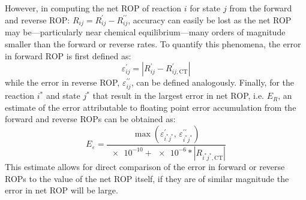 \documentclass[12pt,number,sort&compress]{elsarticle}
\begin{document}
However, in computing the net ROP of reaction $i$ for state $j$ from the forward and reverse ROP: $R_{ij} = R_{ij}^{\prime} - R_{ij}^{\prime\prime}$, accuracy can easily be lost as the net ROP may be---particularly near chemical equilibrium---many orders of magnitude smaller than the forward or reverse rates.
To quantify this phenomena, the error in forward ROP is first defined as:
\begin{equation}
\varepsilon^{\prime}_{ij} = \left\lvert R_{ij}^{\prime} - R_{ij,\text{CT}}^{\prime} \right\rvert
\end{equation}
while the error in reverse ROP, $\varepsilon^{\prime\prime}_{ij}$, can be defined analogously.
Finally, for the reaction $i^{*}$ and state $j^{*}$ that result in the largest error in net ROP, i.e. $E_{R}$, an estimate of the error attributable to floating point error accumulation from the forward and reverse ROPs can be obtained as:
\begin{equation}
E_{\varepsilon} = \frac{\max(\varepsilon^{\prime}_{i^{*}j^{*}}\text{, }\varepsilon^{\prime\prime}_{i^{*}j^{*}})}{\num{e-10} + \num{e-6} * \left\lvert R_{i^{*}j^{*},\text{CT}} \right\rvert}
\end{equation}
This estimate allows for direct comparison of the error in forward or reverse ROPs to the value of the net ROP itself, if they are of similar magnitude the error in net ROP will be large.
\end{document}
